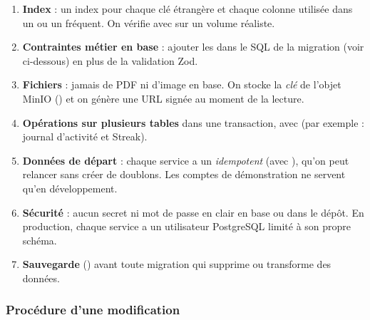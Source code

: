 \begin{tcolorbox}[colback=soft,colframe=navy,title=\textbf{Règles à respecter pour toute modification de la base},fonttitle=\bfseries,breakable,arc=2pt]
\begin{enumerate}[label=\textbf{R\arabic*.},leftmargin=2.2em]
  \item \textbf{Index} : un index pour chaque clé étrangère et chaque colonne utilisée dans un  ou un  fréquent. On vérifie avec  sur un volume réaliste.
  \item \textbf{Contraintes métier en base} : ajouter les  dans le SQL de la migration (voir ci-dessous) en plus de la validation Zod.
  \item \textbf{Fichiers} : jamais de PDF ni d'image en base. On stocke la \emph{clé} de l'objet MinIO () et on génère une URL signée au moment de la lecture.
  \item \textbf{Opérations sur plusieurs tables} dans une transaction, avec  (par exemple : journal d'activité et Streak).
  \item \textbf{Données de départ} : chaque service a un  \emph{idempotent} (avec ), qu'on peut relancer sans créer de doublons. Les comptes de démonstration ne servent qu'en développement.
  \item \textbf{Sécurité} : aucun secret ni mot de passe en clair en base ou dans le dépôt. En production, chaque service a un utilisateur PostgreSQL limité à son propre schéma.
  \item \textbf{Sauvegarde} () avant toute migration qui supprime ou transforme des données.
\end{enumerate}
\end{tcolorbox}

\subsubsection{Procédure d'une modification}

